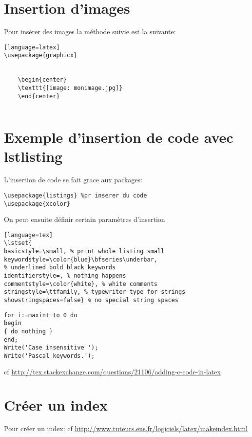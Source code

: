 \section{Insertion d'images}
Pour ins\'erer des images la m\'ethode suivie est la suivante:

\begin{lstlisting}[caption={Insertion d'image}][language=latex]
\usepackage{graphicx}


	\begin{center}
	\texttt{[image: monimage.jpg]} 
	\end{center}


\end{lstlisting}






\section{Exemple d'insertion de code avec lstlisting}
L'insertion de code se fait grace aux packages:

\begin{lstlisting}
\usepackage{listings} %pr inserer du code
\usepackage{xcolor}
\end{lstlisting}

On peut ensuite d\'efinir certain param\`etres d'insertion
\begin{lstlisting}[caption={Commande pour sp\'ecifier les param\`etres d'insertion de code}] [language=tex]
\lstset{
basicstyle=\small, % print whole listing small
keywordstyle=\color{blue}\bfseries\underbar,
% underlined bold black keywords
identifierstyle=, % nothing happens
commentstyle=\color{white}, % white comments
stringstyle=\ttfamily, % typewriter type for strings
showstringspaces=false} % no special string spaces
\end{lstlisting}


\begin{lstlisting}
for i:=maxint to 0 do
begin
{ do nothing }
end;
Write('Case insensitive ');
Write('Pascal keywords.');
\end{lstlisting}


cf \url{http://tex.stackexchange.com/questions/21106/adding-c-code-in-latex}


\section{Cr\'eer un index}
Pour cr\'eer un index:
cf \url{http://www.tuteurs.ens.fr/logiciels/latex/makeindex.html}

